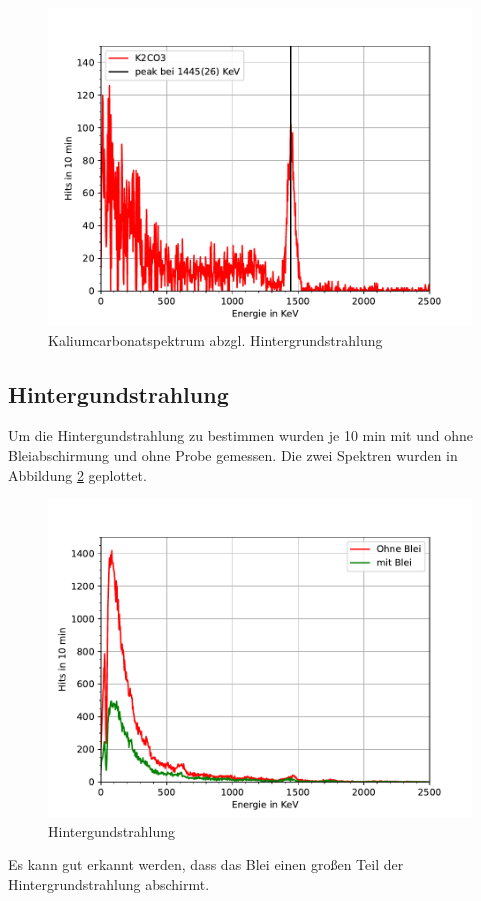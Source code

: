 \documentclass[11pt, a4paper]{article}
\begin{document}
    \begin{figure}[!h]
        \centering
        \includegraphics[width=\textwidth]{Plots/K2CO3.pdf}

        \caption{Kaliumcarbonatspektrum abzgl. Hintergrundstrahlung}
        \label{fig:Kaspektrum}
    \end{figure}


    \subsection{Hintergundstrahlung}
    Um die Hintergundstrahlung zu bestimmen wurden je 10 min mit und ohne Bleiabschirmung und ohne Probe gemessen. Die zwei Spektren wurden in Abbildung \ref{fig:hintergrund} geplottet.
    \begin{figure}[!h]
        \centering
        \includegraphics[width=\textwidth]{Plots/Untergrund.pdf}
        \caption{Hintergundstrahlung}
        \label{fig:hintergrund}
    \end{figure}
    Es kann gut erkannt werden, dass das Blei einen großen Teil der Hintergrundstrahlung abschirmt.
\end{document}
